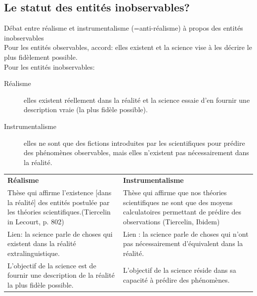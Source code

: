 \documentclass{report}
\begin{document}
	\subsection{Le statut des entités inobservables?}
	
	Débat entre réalisme et instrumentalisme (=anti-réalisme) à propos des entités inobservables\\
	Pour les entités observables, accord: elles existent et la science vise à les décrire le plus fidèlement possible.\\
	Pour les entités inobservables:
	\begin{description}
		\item[Réalisme] elles existent réellement dans la réalité et la science essaie d’en fournir une description \og vraie \fg (la plus fidèle possible).
		\item[Instrumentalisme] elles ne sont que des fictions introduites par les scientifiques pour prédire des phénomènes observables, mais elles n’existent pas nécessairement dans la réalité.
	\end{description}
	
	\begin{center}
		\begin{tabular}{|p{}|p{}|}
			\hline \textbf{Réalisme} & \textbf{Instrumentalisme}\\
			\hhline{|=|=|} Thèse qui affirme \og l’existence [dans la réalité] des entités postulée par les théories scientifiques.\fg  (Tiercelin in Lecourt, p. 802) & Thèse qui affirme que \og nos théories scientifiques ne sont que des moyens calculatoires permettant de prédire des observations \fg (Tiercelin, Ibidem) \\
			\hline Lien: la science parle de choses qui existent dans la réalité extralinguistique. &  Lien : la science parle de choses qui n’ont pas nécessairement d’équivalent dans la réalité. \\
			\hline L’objectif de la science est de fournir une description de la réalité la plus fidèle possible. & L’objectif de la science réside dans sa capacité à prédire des phénomènes. \\
			\hline
		\end{tabular}
	\end{center}
	
\end{document}
